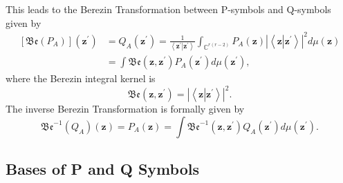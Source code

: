 \documentclass[aps,preprint]{revtex4}%
\begin{document}
\bigskip\qquad This leads to the Berezin Transformation \cite{BerezinTrans}
between P-symbols and Q-symbols given by
\begin{align}
\left[  \mathfrak{Be}\left(  P_{A}\right)  \right]  \left(  \mathbf{z}%
^{\prime}\right)   &  =Q_{A}\left(  \mathbf{z}^{\prime}\right)  =\frac
{1}{\left\langle \mathbf{z}^{\prime}\mathbf{\left\vert \mathbf{z}^{\prime
}\right.  }\right\rangle }\int_{\mathbb{C}^{r\left(  r-2\right)  }}%
P_{A}\left(  \mathbf{z}\right)  \left\vert \left\langle \mathbf{z\left\vert
\mathbf{z}^{\prime}\right.  }\right\rangle \right\vert ^{2}d\mu\left(
\mathbf{z}\right) \nonumber\\
&  =\int\mathfrak{Be}\left(  \mathbf{z,z}^{\prime}\right)  P_{A}\left(
\mathbf{z}^{\prime}\right)  d\mu\left(  \mathbf{z}^{\prime}\right)  ,
\end{align}
where the Berezin integral kernel is
\begin{equation}
\mathfrak{Be}\left(  \mathbf{z,z}^{\prime}\right)  =\left\vert \left\langle
\mathbf{z\left\vert \mathbf{z}^{\prime}\right.  }\right\rangle \right\vert
^{2}.
\end{equation}
The inverse Berezin Transformation is formally given by
\begin{equation}
\mathfrak{Be}^{-1}\left(  Q_{A}\right)  \left(  \mathbf{z}\right)
=P_{A}\left(  \mathbf{z}\right)  =\int\mathfrak{Be}^{-1}\left(  \mathbf{z,z}%
^{\prime}\right)  Q_{A}\left(  \mathbf{z}^{\prime}\right)  d\mu\left(
\mathbf{z}^{\prime}\right)  .
\end{equation}


\subsection{Bases of P and Q Symbols}
\end{document}
